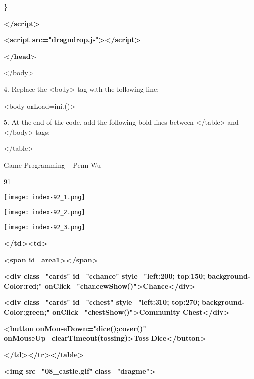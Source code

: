 \documentclass[
]{article}
\begin{document}
\textbf{\}}

\textbf{\textless/script\textgreater{}}

\textbf{}

\textbf{\textless script
src="dragndrop.js"\textgreater\textless/script\textgreater{}}

\textbf{\textless/head\textgreater{}}

\textbf{}

\textless/body\textgreater{}

4. Replace the \textless body\textgreater{} tag with the following line:

\textless body onLoad=init()\textgreater{}

5. At the end of the code, add the following bold lines between
\textless/table\textgreater{} and \textless/body\textgreater{} tags:

\textless/table\textgreater{}

Game Programming -- Penn Wu

91

\protect\hypertarget{index_split_006.htmlux5cux23p92}{}{}\texttt{[image: index-92\_1.png]}

\texttt{[image: index-92\_2.png]}

\texttt{[image: index-92\_3.png]}

\textbf{\textless/td\textgreater\textless td\textgreater{}}

\textbf{\textless span id=area1\textgreater\textless/span\textgreater{}}

\textbf{}

\textbf{\textless div class="cards" id="cchance" style="left:200;
top:150;} \textbf{background-Color:red;"
onClick="chancewShow()"\textgreater Chance\textless/div\textgreater{}}

\textbf{}

\textbf{\textless div class="cards" id="cchest" style="left:310;
top:270;} \textbf{background-Color:green;"
onClick="chestShow()"\textgreater Community
Chest\textless/div\textgreater{}}

\textbf{}

\textbf{\textless button onMouseDown="dice();cover()"
onMouseUp=clearTimeout(tossing)\textgreater Toss}
\textbf{Dice\textless/button\textgreater{}}

\textbf{\textless/td\textgreater\textless/tr\textgreater\textless/table\textgreater{}}

\textbf{}

\textbf{\textless img src="08\_castle.gif" class="dragme"\textgreater{}}
\end{document}
